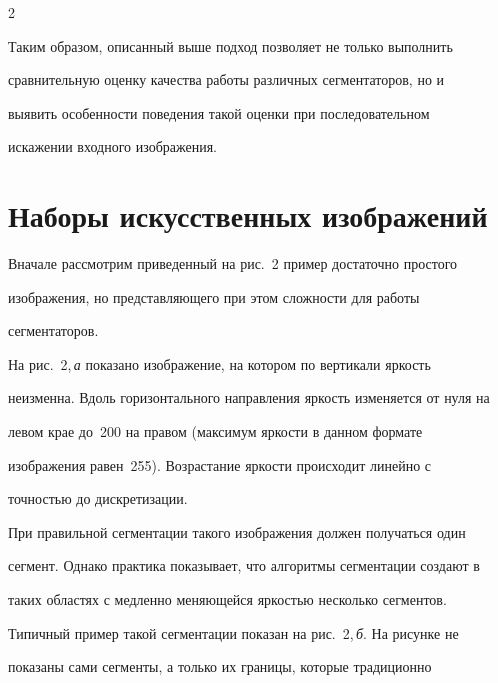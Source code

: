 \begin{multicols}{2}
\begin{enumerate}[1.]
   \end{enumerate}


   


   Таким образом, описанный выше подход позволяет не только выполнить 


сравнительную оценку качества работы различных сегментаторов, но и 


выявить особенности поведения такой оценки при последовательном 


искажении входного изображения.


  


  \section{Наборы искусственных изображений}


  


  Вначале рассмотрим приведенный на рис.~2 пример достаточно простого 


изображения, но пред\-став\-ля\-юще\-го при этом сложности для работы 


сегментаторов.


        





На рис.~2,\,\textit{а} показано изображение, на котором по вертикали яркость 


неизменна. Вдоль горизонтального направления яркость изменяется от нуля на 


левом крае до~200 на правом (максимум яркости в данном формате 


изображения равен~255). Возрастание яркости происходит линейно с 


точ\-ностью до дискретизации.


  


  При правильной сегментации такого изображения должен получаться один 


сегмент. Однако практика показывает, что алгоритмы сегментации создают в 


таких областях с медленно меняющейся яркостью несколько сегментов. 


Типичный пример такой сегментации показан на рис.~2,\,\textit{б}. На рисунке не 


показаны сами сегменты, а только их границы, которые традиционно 



\end{multicols}
